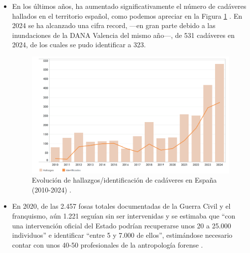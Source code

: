 
\begin{itemize}

    \item En los últimos años, ha aumentado significativamente el número de cadáveres hallados en el territorio español, como podemos apreciar en la Figura \ref{fig:evolucion_hallazgosID_cadaveres} \cite{interior2025desaparecidos}. En 2024 se ha alcanzado una cifra record, ---en gran parte debido a las inundaciones de la DANA Valencia del mismo año---, de 531 cadáveres en 2024, de los cuales se pudo identificar a 323.

    \begin{figure}[htbp]
        \centering
        \includegraphics[width=\textwidth]{capitulos/cap_01/imagenes/hallazgos_cadaveres.png}
        \caption[
            Evolución de hallazgos/identificación de cadáveres en España (2010-2024) \cite{interior2025desaparecidos}.
        ]{
            Evolución de hallazgos/identificación de cadáveres en España (2010-2024) \cite{interior2025desaparecidos}. 
        } 
        \label{fig:evolucion_hallazgosID_cadaveres}
    \end{figure}

    \item En 2020, de las 2.457 fosas totales documentadas de la Guerra Civil y el franquismo, aún 1.221 seguían sin ser intervenidas y se estimaba que ``con una intervención oficial del Estado podrían recuperarse unos 20 a 25.000 individuos'' e identificar ``entre 5 y 7.000 de ellos'', estimándose  necesario contar con unos 40-50 profesionales de la antropología forense \cite{etxeberria2020}. 



\end{itemize}
